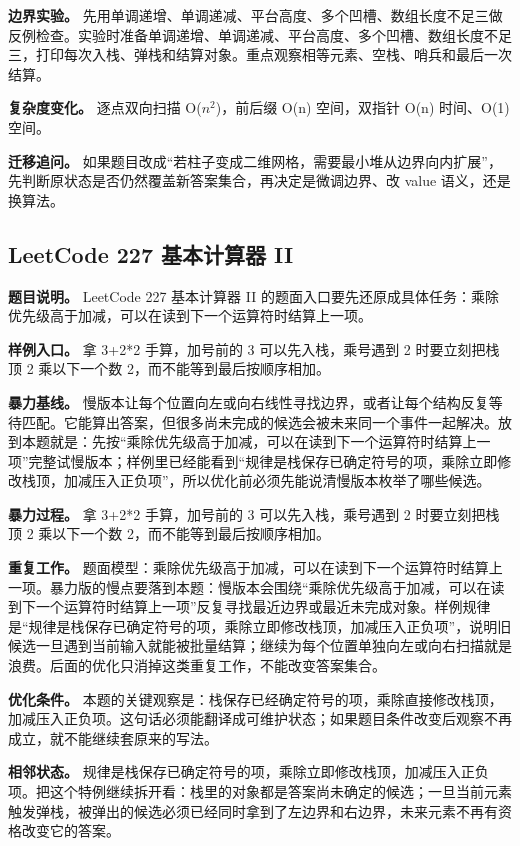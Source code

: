 \textbf{边界实验。} 先用单调递增、单调递减、平台高度、多个凹槽、数组长度不足三做反例检查。实验时准备单调递增、单调递减、平台高度、多个凹槽、数组长度不足三，打印每次入栈、弹栈和结算对象。重点观察相等元素、空栈、哨兵和最后一次结算。

\textbf{复杂度变化。} 逐点双向扫描 O(\ensuremath{n^{2}})，前后缀 O(n) 空间，双指针 O(n) 时间、O(1) 空间。

\textbf{迁移追问。} 如果题目改成“若柱子变成二维网格，需要最小堆从边界向内扩展”，先判断原状态是否仍然覆盖新答案集合，再决定是微调边界、改 value 语义，还是换算法。

\subsection{LeetCode 227 基本计算器 II}

\textbf{题目说明。} LeetCode 227 基本计算器 II 的题面入口要先还原成具体任务：乘除优先级高于加减，可以在读到下一个运算符时结算上一项。

\textbf{样例入口。} 拿 3+2*2 手算，加号前的 3 可以先入栈，乘号遇到 2 时要立刻把栈顶 2 乘以下一个数 2，而不能等到最后按顺序相加。

\textbf{暴力基线。} 慢版本让每个位置向左或向右线性寻找边界，或者让每个结构反复等待匹配。它能算出答案，但很多尚未完成的候选会被未来同一个事件一起解决。放到本题就是：先按“乘除优先级高于加减，可以在读到下一个运算符时结算上一项”完整试慢版本；样例里已经能看到“规律是栈保存已确定符号的项，乘除立即修改栈顶，加减压入正负项”，所以优化前必须先能说清慢版本枚举了哪些候选。

\textbf{暴力过程。} 拿 3+2*2 手算，加号前的 3 可以先入栈，乘号遇到 2 时要立刻把栈顶 2 乘以下一个数 2，而不能等到最后按顺序相加。

\textbf{重复工作。} 题面模型：乘除优先级高于加减，可以在读到下一个运算符时结算上一项。暴力版的慢点要落到本题：慢版本会围绕“乘除优先级高于加减，可以在读到下一个运算符时结算上一项”反复寻找最近边界或最近未完成对象。样例规律是“规律是栈保存已确定符号的项，乘除立即修改栈顶，加减压入正负项”，说明旧候选一旦遇到当前输入就能被批量结算；继续为每个位置单独向左或向右扫描就是浪费。后面的优化只消掉这类重复工作，不能改变答案集合。

\textbf{优化条件。} 本题的关键观察是：栈保存已经确定符号的项，乘除直接修改栈顶，加减压入正负项。这句话必须能翻译成可维护状态；如果题目条件改变后观察不再成立，就不能继续套原来的写法。

\textbf{相邻状态。} 规律是栈保存已确定符号的项，乘除立即修改栈顶，加减压入正负项。把这个特例继续拆开看：栈里的对象都是答案尚未确定的候选；一旦当前元素触发弹栈，被弹出的候选必须已经同时拿到了左边界和右边界，未来元素不再有资格改变它的答案。

